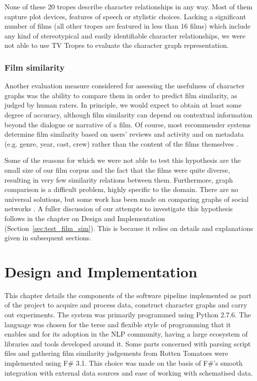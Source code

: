 \documentclass[bsc,frontabs,singlespacing,parskip, twoside]{infthesis}
\begin{document}
None of these 20 tropes describe character relationships in any way. Most of them capture plot devices, features of speech or stylistic choices. Lacking a significant number of films (all other tropes are featured in less than 16 films) which include any kind of stereotypical and easily identifiable character relationships, we were not able to use TV Tropes to evaluate the character graph representation.

\subsection{Film similarity}
\label{sec:hyp_film_sim}
Another evaluation measure considered for assessing the usefulness of character graphs was the ability to compare them in order to predict film similarity, as judged by human raters. In principle, we would expect to obtain at least some degree of accuracy, although film similarity can depend on contextual information beyond the dialogue or narrative of a film. Of course, most recommender systems determine film similarity based on users' reviews and activity and on metadata (e.g. genre, year, cast, crew) rather than the content of the films themselves \cite{said2010putting}.

Some of the reasons for which we were not able to test this hypothesis are the small size of our film corpus and the fact that the films were quite diverse, resulting in very few similarity relations between them. Furthermore, graph comparison is a difficult problem, highly specific to the domain. There are no universal solutions, but some work has been made on comparing graphs of social networks \cite{macindoe2010graph}. A fuller discussion of our attempts to investigate this hypothesis follows in the chapter on Design and Implementation (Section~\ref{sec:test_film_sim}). This is because it relies on details and explanations given in subsequent sections.

\chapter{Design and Implementation}
\label{chap:design}
This chapter details the components of the software pipeline implemented as part of the project to acquire and process data, construct character graphs and carry out experiments. The system was primarily programmed using Python 2.7.6. The language was chosen for the terse and flexible style of programming that it enables and for its adoption in the NLP community, having a large ecosystem of libraries and tools developed around it. Some parts concerned with parsing script files and gathering film similarity judgements from Rotten Tomatoes were implemented using F\# 3.1. This choice was made on the basis of F\#'s smooth integration with external data sources and ease of working with schematised data.
\end{document}
